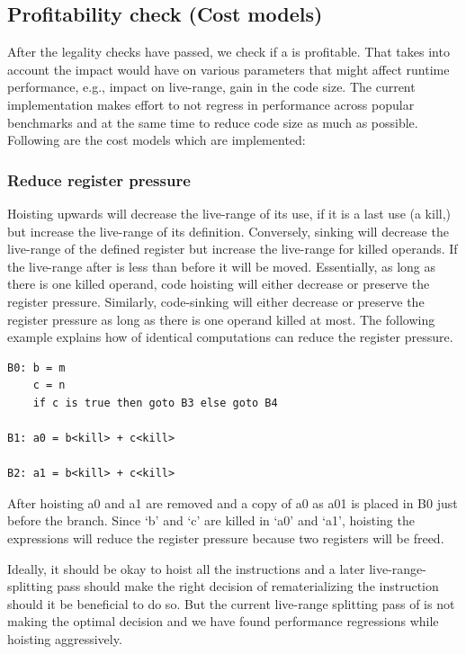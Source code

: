 \documentclass[acmlarge,review,anonymous]{acmart}\settopmatter{printfolios=true}
\begin{document}
\subsection{Profitability check (Cost models)}
\label{subsec:cost-models}
After the legality checks have passed, we check if a \gcm{} is profitable.  That
takes into account the impact \gcm{} would have on various parameters that might
affect runtime performance, e.g., impact on live-range, gain in the code
size. The current implementation makes effort to not regress in performance
across popular benchmarks and at the same time to reduce code size as much as
possible. Following are the cost models which are implemented:

\subsubsection{Reduce register pressure}
\label{hoist:reg-pressure}
Hoisting upwards will decrease the live-range of its use, if it is a last use (a
kill,) but increase the live-range of its definition. Conversely, sinking will
decrease the live-range of the defined register but increase the live-range for
killed operands. If the live-range after \gcm{} is less than before it will
be moved. Essentially, as long as there is one killed operand, code hoisting
will either decrease or preserve the register pressure.  Similarly, code-sinking
will either decrease or preserve the register pressure as long as there is one
operand killed at most.  The following example explains how \gcm{} of
identical computations can reduce the register pressure.

\begin{verbatim}
B0: b = m
    c = n
    if c is true then goto B3 else goto B4

B1: a0 = b<kill> + c<kill>

B2: a1 = b<kill> + c<kill>
\end{verbatim}

After hoisting a0 and a1 are removed and a copy of a0 as a01 is placed in B0
just before the branch. Since `b' and `c' are killed in `a0' and `a1', hoisting
the expressions will reduce the register pressure because two registers will be
freed.

Ideally, it should be okay to hoist all the instructions and a later
live-range-splitting \cite{cooper1998live} pass should make the right decision
of rematerializing the instruction should it be beneficial to do so. But the
current live-range splitting pass of \LLVM{} is not making the optimal decision
and we have found performance regressions while hoisting aggressively.
\end{document}
